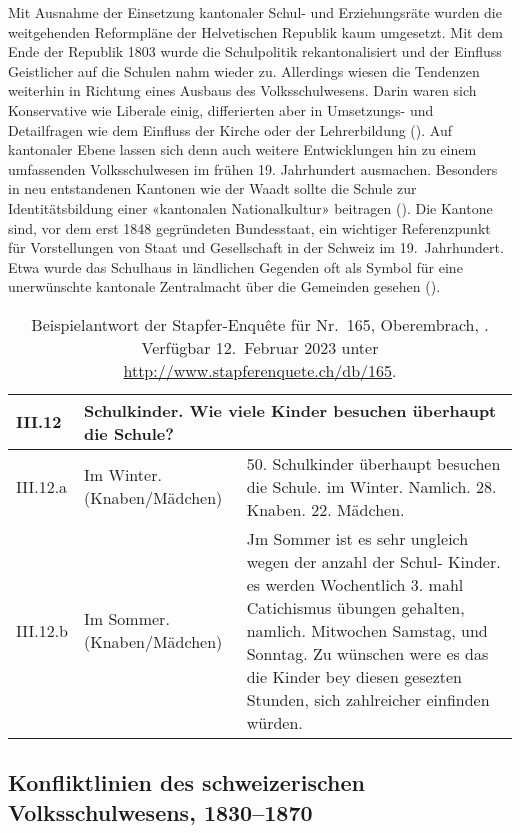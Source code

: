 Mit Ausnahme der Einsetzung kantonaler Schul- und Erziehungsräte wurden die weitgehenden Reformpläne der Helvetischen Republik kaum umgesetzt. Mit dem Ende der Republik 1803 wurde die Schulpolitik rekantonalisiert und der Einfluss Geistlicher auf die Schulen nahm wieder zu. Allerdings wiesen die Tendenzen weiterhin in Richtung eines Ausbaus des Volksschulwesens. Darin waren sich Konservative wie Liberale einig, differierten aber in Umsetzungs- und Detailfragen wie dem Einfluss der Kirche oder der Lehrerbildung (\cite[233-234]{butikofer_staat_2006}). Auf kantonaler Ebene lassen sich denn auch weitere Entwicklungen hin zu einem umfassenden Volksschulwesen im frühen 19. Jahrhundert ausmachen. Besonders in neu entstandenen Kantonen wie der Waadt sollte die Schule zur Identitätsbildung einer «kantonalen Nationalkultur» beitragen (\cite{rothenbuhler_neue_2010}). Die Kantone sind, vor dem erst 1848 gegründeten Bundesstaat, ein wichtiger Referenzpunkt für Vorstellungen von Staat und Gesellschaft in der Schweiz im 19.~Jahrhundert. Etwa wurde das Schulhaus in ländlichen Gegenden oft als Symbol für eine unerwünschte kantonale Zentralmacht über die Gemeinden gesehen (\cite[16]{criblez_einleitung_1999}).

\hspace{1cm}

\begin{table}[!ht]
    \centering
    \begin{tabular}{lp{3cm}p{8cm}}
        \toprule
        III.12  & \multicolumn{2}{l}{Schulkinder. Wie viele Kinder besuchen überhaupt die Schule?} \\ 
        \midrule
        III.12.a & Im Winter. (Knaben/Mädchen) & 50. Schulkinder überhaupt besuchen die Schule. im Winter. Namlich. 28. Knaben. 22. Mädchen. \\ 
        III.12.b & Im Sommer. (Knaben/Mädchen) & Jm Sommer ist es sehr ungleich wegen der anzahl der Schul- Kinder. es werden Wochentlich 3. mahl Catichismus übungen gehalten, namlich. Mitwochen Samstag, und Sonntag. Zu wünschen were es das die Kinder bey diesen gesezten Stunden, sich zahlreicher einfinden würden. \\
        \bottomrule
    \end{tabular}
    \caption{Beispielantwort der Stapfer-Enquête für Nr.~165, Oberembrach, \cite{schmidt_stapfer-enquete_2015}. Verfügbar 12.~Februar 2023 unter \url{http://www.stapferenquete.ch/db/165}.}
    \label{table:2-1}
\end{table}

\subsection{Konfliktlinien des schweizerischen Volksschulwesens, 1830–1870}


